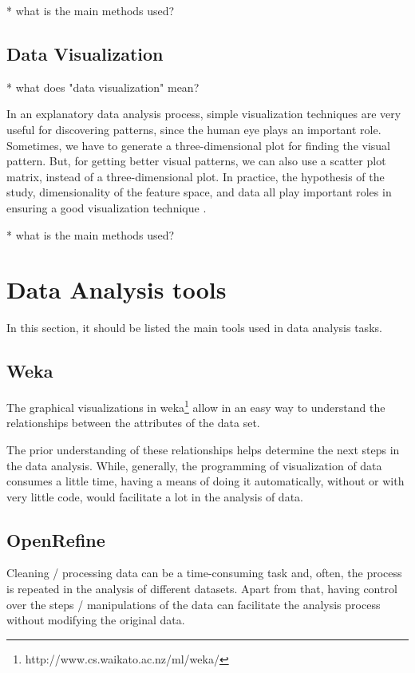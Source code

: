 \documentclass[12pt,a4paper]{amsart}
\numberwithin{equation}{section}
\theoremstyle{plain}
\theoremstyle{definition}
\begin{document}
* what is the main methods used?


\subsection{Data Visualization}\label{data-visualization}

* what does "data visualization" mean?

In an explanatory data analysis process, simple visualization techniques are very useful for discovering patterns, since the human eye plays an important role. Sometimes, we have to generate a three-dimensional plot for finding the visual pattern. But, for getting better visual patterns, we can also use a scatter plot matrix, instead of a three-dimensional plot. In practice, the hypothesis of the study, dimensionality of the feature space, and data all play important roles in ensuring a good visualization technique \cite{cuesta2016practical}.

* what is the main methods used?


\section{Data Analysis tools}\label{tools}

In this section, it should be listed the main tools used in data analysis tasks.


\subsection{Weka}\label{weka}

The graphical visualizations in weka\footnote{http://www.cs.waikato.ac.nz/ml/weka/} allow in an easy way to understand the relationships between the attributes of the data set.

The prior understanding of these relationships helps determine the next steps in the data analysis. While, generally, the programming of visualization of data consumes a little time, having a means of doing it automatically, without or with very little code, would facilitate a lot in the analysis of data.

\subsection{OpenRefine}\label{openrefine}

Cleaning / processing data can be a time-consuming task and, often, the process is repeated in the analysis of different datasets. Apart from that, having control over the steps / manipulations of the data can facilitate the analysis process without modifying the original data.
\end{document}
